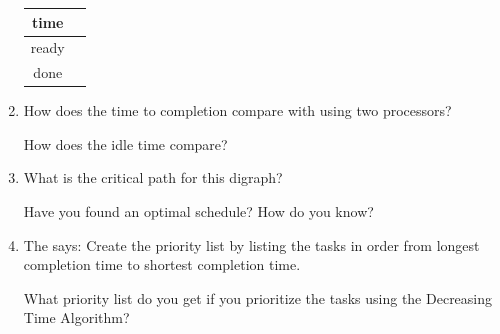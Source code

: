 \documentclass[12pt]{article}
\begin{document}
\begin{enumerate}

\hspace*{-1in}	\begin{tabular}{c || c}
time &   \quad \hspace{6in} \quad \\ \hline
ready& \\ \hline
done& \\ \hline
\end{tabular}

\hspace*{-2cm}

\item How does the time to completion compare with using two processors?

\vspace{.5cm}

How does the idle time compare? \vspace{.5cm}

\item What is the critical path for this digraph? \hrulefill

Have you found an optimal schedule? How do you know?

\vspace{1cm}

\item 
\begin{adjustbox}{valign=t,minipage={.4\textwidth}}
The  says: Create the priority list by listing the tasks in order from longest completion time to shortest completion time.
\end{adjustbox}
\hfill
\begin{adjustbox}{valign=t,minipage={.4\textwidth}}
\mydigraph
\end{adjustbox}




 What priority list do you get if you prioritize the tasks using the Decreasing Time Algorithm?


\end{enumerate}
\end{document}

